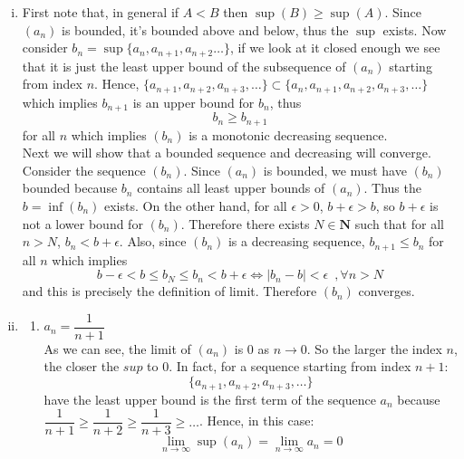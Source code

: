 \documentclass[10pt,letterpaper]{article}
\begin{document}
	\begin{enumerate}[(i)]
		\item 
		First note that, in general if $A < B$ then $\sup(B) \geq \sup(A)$. 
		Since $(a_n)$ is bounded, it's bounded above and below, thus the $\sup$ exists.
		Now consider $b_n = \sup\{a_n, a_{n+1}, a_{n+2} \ldots\}$, if we look at it closed enough we 
		see that it is just the least upper bound of the subsequence of $(a_n)$ starting from index $n$.
		Hence, $\{a_{n+1}, a_{n+2}, a_{n+3}, \ldots \} \subset \{a_n, a_{n+1}, a_{n+2}, a_{n+3}, \ldots \}$
		which implies $b_{n+1}$ is an upper bound for $b_{n}$, thus
			$$b_{n} \geq b_{n+1}$$
		for all $n$ which implies $(b_n)$ is a monotonic decreasing sequence. \\
		Next we will show that
		a bounded sequence and decreasing will converge. Consider the sequence $(b_n)$. Since
		$(a_n)$ is bounded, we must have $(b_n)$ bounded because $b_n$ contains all least
		upper bounds of $(a_n)$. Thus the $b = \inf{(b_n)}$ exists. On the other hand, for all $\epsilon > 0$,
		$b + \epsilon > b$, so $b + \epsilon$ is not a lower bound for $(b_n)$. Therefore there exists
		$N \in \mathbf{N}$ such that for all $n > N$, $b_n < b + \epsilon$. Also, since $(b_n)$ is a decreasing
		sequence, $b_{n+1} \leq b_{n}$ for all $n$ which implies
		$$b - \epsilon < b \leq b_N \leq b_n < b + \epsilon
		\Leftrightarrow |b_n - b| < \epsilon \, \, \, ,\forall n > N		
		$$
		and this is precisely the definition of limit. Therefore $(b_n)$ converges.
		
		\item 
		\begin{enumerate}
		\item $a_n = \dfrac{1}{n + 1}$ \\
		As we can see, the limit of $(a_n)$ is $0$ as $n \rightarrow 0$. So the larger the index $n$,
		the closer the $sup$ to 0. In fact, for a sequence starting from index $n+1$:
			$$\{a_{n+1}, a_{n+2}, a_{n+3}, \ldots \}$$
		have the least upper bound is the first term of the sequence $a_{n}$ because $\dfrac{1}{n+1} \geq \dfrac{1}{n+2} \geq \dfrac{1}{n+3} \geq \ldots$.		
		Hence, in this case:
		$$\displaystyle\lim_{n\to\infty} \sup(a_n) = \displaystyle\lim_{n\to\infty} a_n = 0$$ 	 
		

\end{enumerate}
\end{enumerate}
\end{document}
